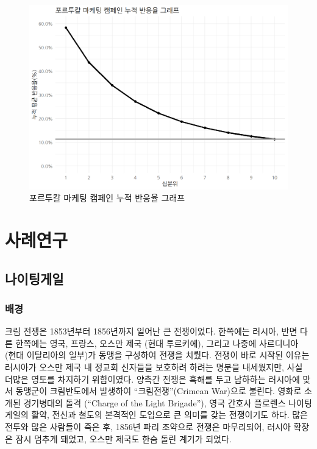 \documentclass[
  letterpaper,
  chapter,a4paper,showtrims,openright,hidelinks]{oblivoir}
\begin{document}
\begin{figure}

{\centering \includegraphics{images/model_value_cumulative.png}

}

\caption{포르투칼 마케팅 캠페인 누적 반응율 그래프}

\end{figure}

\part{사례연구}

\hypertarget{uxb098uxc774uxd305uxac8cuxc77c}{%
\chapter{나이팅게일}\label{uxb098uxc774uxd305uxac8cuxc77c}}

\hypertarget{uxbc30uxacbd}{%
\section{배경}\label{uxbc30uxacbd}}

크림 전쟁은 1853년부터 1856년까지 일어난 큰 전쟁이었다. 한쪽에는 러시아,
반면 다른 한쪽에는 영국, 프랑스, 오스만 제국 (현대 투르키에), 그리고
나중에 사르디니아 (현대 이탈리아의 일부)가 동맹을 구성하여 전쟁을
치뤘다. 전쟁이 바로 시작된 이유는 러시아가 오스만 제국 내 정교회
신자들을 보호하려 하려는 명분을 내세웠지만, 사실 더많은 영토를 차지하기
위함이였다. 양측간 전쟁은 흑해를 두고 남하하는 러시아에 맞서 동맹군이
크림반도에서 발생하여 ``크림전쟁''(Crimean War)으로 불린다. 영화로
소개된 경기병대의 돌격 (``Charge of the Light Brigade''), 영국 간호사
플로렌스 나이팅게일의 활약, 전신과 철도의 본격적인 도입으로 큰 의미를
갖는 전쟁이기도 하다. 많은 전투와 많은 사람들이 죽은 후, 1856년 파리
조약으로 전쟁은 마무리되어, 러시아 확장은 잠시 멈추게 돼었고, 오스만
제국도 한숨 돌린 계기가 되었다.
\end{document}
